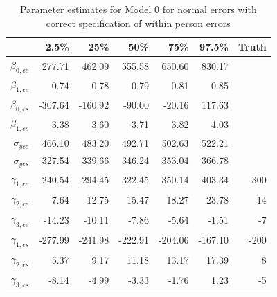 \documentclass[11pt]{article}\usepackage[]{graphicx}\usepackage[]{color}
\begin{document}
\begin{table}[ht]
\centering
\begin{tabular}{rrrrrr|r}
  \hline
 & 2.5\% & 25\% & 50\% & 75\% & 97.5\% & Truth\\ 
  \hline
$\beta_{0,ee}$ & 277.71 & 462.09 & 555.58 & 650.60 & 830.17 \\ 
  $\beta_{1,ee}$ & 0.74 & 0.78 & 0.79 & 0.81 & 0.85 \\ 
  $\beta_{0,es}$ & -307.64 & -160.92 & -90.00 & -20.16 & 117.63 \\ 
  $\beta_{1,es}$ & 3.38 & 3.60 & 3.71 & 3.82 & 4.03 \\ 
  $\sigma_{yee}$ & 466.10 & 483.20 & 492.71 & 502.63 & 522.21 \\ 
  $\sigma_{yes}$ & 327.54 & 339.66 & 346.24 & 353.04 & 366.78 \\ 
  $\gamma_{1,ee}$ & 240.54 & 294.45 & 322.45 & 350.14 & 403.34 & 300\\ 
  $\gamma_{2,ee}$ & 7.64 & 12.75 & 15.47 & 18.27 & 23.78 & 14 \\ 
  $\gamma_{3,ee}$ & -14.23 & -10.11 & -7.86 & -5.64 & -1.51 & -7 \\ 
  $\gamma_{1,es}$ & -277.99 & -241.98 & -222.91 & -204.06 & -167.10 & -200 \\ 
  $\gamma_{2,es}$ & 5.37 & 9.17 & 11.18 & 13.17 & 17.39 & 8 \\ 
  $\gamma_{3,es}$ & -8.14 & -4.99 & -3.33 & -1.76 & 1.23 & -5\\ 
   \hline
\end{tabular}
\caption{Parameter estimates for Model 0 for normal errors with correct specification of within person errors}
\label{m0wpestimates}
\end{table}
\end{document}
